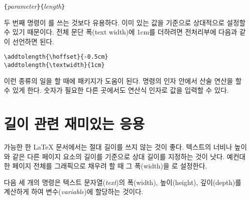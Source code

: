 \begin{lscommand}
\verb|{|\emph{parameter}\verb|}{|\emph{length}\verb|}|
\end{lscommand}

두 번째 명령이 를 쓰는 것보다 유용하다. 이미 있는 값을 기준으로 상대적으로 설정할 수 있기 때문이다. 전체 문단 폭(text width)에 1cm를 더하려면 
전처리부에 다음과 같이 선언하면 된다.
\begin{code}
\verb|\addtolength{\hoffset}{-0.5cm}|\\
\verb|\addtolength{\textwidth}{1cm}|
\end{code}

이런 종류의 일을 할 때에  패키지가 도움이 된다.
 명령의 인자 안에서 산술 연산을 할 수 있게 한다.
숫자가 필요한 다른 곳에서도 연산식 인자로 값을 입력할 수 있다.

\section{길이 관련 재미있는 응용}

가능한 한 \LaTeX{} 문서에서는 절대 길이를 쓰지 않는 것이 좋다.
텍스트의 너비나 높이와 같은 다른 페이지 요소의 길이를 기준으로 상대 길이를 
지정하는 것이 낫다. 예컨대
한 페이지 전체를 그래픽으로 채우려 할 때 그 폭(width)을 로 설정한다.

다음 세 개의 명령은 텍스트 문자열(\emph{text})의 폭(width), 높이(height), 깊이(depth)를 계산하게 하여 변수(\emph{variable})에 할당하는 것이다.

